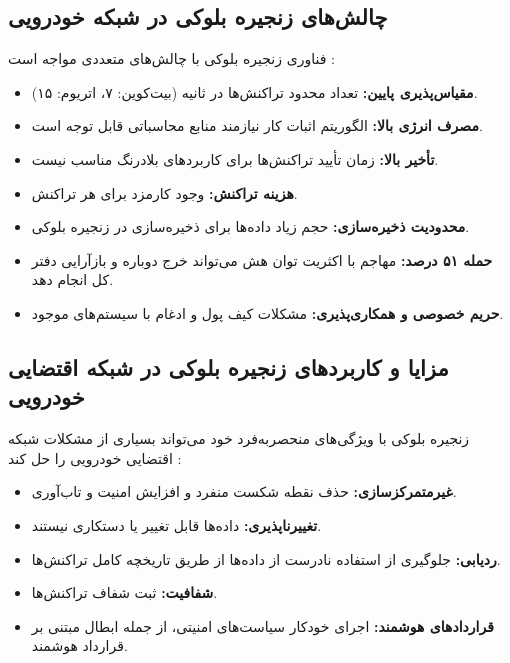 \documentclass[12pt,a4paper]{article}
\begin{document}
\subsection{چالش‌های زنجیره بلوکی در شبکه خودرویی}

فناوری زنجیره بلوکی با چالش‌های متعددی مواجه است \cite{razaBlockchainBasedReputationTrust2024}:

\begin{itemize}
  \item \textbf{مقیاس‌پذیری پایین:} تعداد محدود تراکنش‌ها در ثانیه (بیت‌کوین: ۷، اتریوم: ۱۵).
  \item \textbf{مصرف انرژی بالا:} الگوریتم اثبات کار نیازمند منابع محاسباتی قابل توجه است.
  \item \textbf{تأخیر بالا:} زمان تأیید تراکنش‌ها برای کاربردهای بلادرنگ مناسب نیست.
  \item \textbf{هزینه تراکنش:} وجود کارمزد برای هر تراکنش.
  \item \textbf{محدودیت ذخیره‌سازی:} حجم زیاد داده‌ها برای ذخیره‌سازی در زنجیره بلوکی.
  \item \textbf{حمله ۵۱ درصد:} مهاجم با اکثریت توان هش می‌تواند خرج دوباره و بازآرایی دفتر کل انجام دهد.
  \item \textbf{حریم خصوصی و همکاری‌پذیری:} مشکلات کیف پول و ادغام با سیستم‌های موجود.
\end{itemize}

\subsection{مزایا و کاربردهای زنجیره بلوکی در شبکه اقتضایی خودرویی}

زنجیره بلوکی با ویژگی‌های منحصربه‌فرد خود می‌تواند بسیاری از مشکلات شبکه اقتضایی خودرویی را حل کند \cite{razaBlockchainBasedReputationTrust2024, fengBPASBlockchainAssistedPrivacyPreserving2020, ghovanlooyghajarSBTMSScalableBlockchain2021}:

\begin{itemize}
  \item \textbf{غیرمتمرکزسازی:} حذف نقطه شکست منفرد و افزایش امنیت و تاب‌آوری.
  \item \textbf{تغییرناپذیری:} داده‌ها قابل تغییر یا دستکاری نیستند.
  \item \textbf{ردیابی:} جلوگیری از استفاده نادرست از داده‌ها از طریق تاریخچه کامل تراکنش‌ها.
  \item \textbf{شفافیت:} ثبت شفاف تراکنش‌ها.
  \item \textbf{قراردادهای هوشمند:} اجرای خودکار سیاست‌های امنیتی، از جمله ابطال مبتنی بر قرارداد هوشمند.
\end{itemize}
\end{document}
